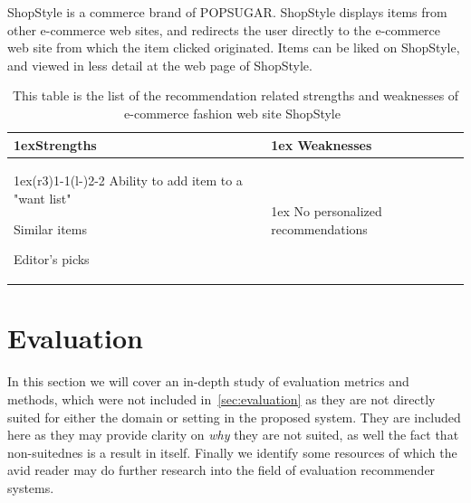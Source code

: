     ShopStyle is a commerce brand of POPSUGAR.
    ShopStyle displays items from other e-commerce web sites, and redirects the user directly to the e-commerce web site from which the item clicked originated.
    Items can be liked on ShopStyle, and viewed in less detail at the web page of ShopStyle.
    \begin{table}[H]
                    \centering
                    \begin{tabularx}{\linewidth}{>{\parskip1ex}X@{\kern4\tabcolsep}>{\parskip1ex}X}
                    \toprule
                    \hfil\bfseries Strengths
                    &
                    \hfil\bfseries Weaknesses
                    \\\cmidrule(r{3\tabcolsep}){1-1}\cmidrule(l{-\tabcolsep}){2-2}
                Ability to add item to a "want list" \par
                Similar items \par
                Editor's picks \par
            &
                No personalized recommendations \par
            \\ \bottomrule
        \end{tabularx}
        \caption[Recommendation related strengths and weaknesses of ShopStyle~\cite{ShopStyle}]{This table is the list of the recommendation related strengths and weaknesses of e-commerce fashion web site ShopStyle~\cite{ShopStyle}}
        \label{table:ecommenreceShopStyle}
    \end{table}

\section{Evaluation}
\label{appendix:evaluation-metrics}

In this section we will cover an in-depth study of evaluation metrics and
methods, which were not included in~\ref{sec:evaluation} as they are not
directly suited for either the domain or setting in the proposed system.
They are included here as they may provide clarity on \textit{why} they are not
suited, as well the fact that non-suitednes is a result in itself. Finally we
identify some resources of which the avid reader may do further research into
the field of evaluation recommender systems.

